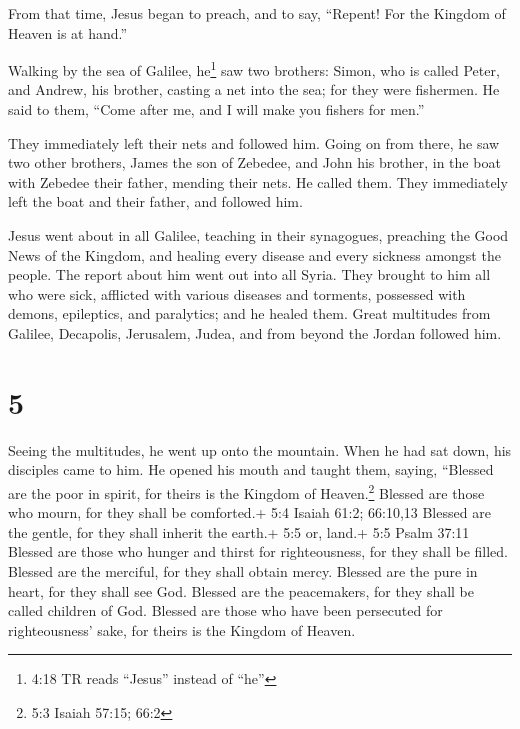  From that time, Jesus began to preach, and to say,
``Repent! For the Kingdom of Heaven is at hand.''

 Walking by the sea of Galilee, he\footnote{4:18 TR reads
  ``Jesus'' instead of ``he''} saw two brothers: Simon, who is called
Peter, and Andrew, his brother, casting a net into the sea; for they
were fishermen.  He said to them, ``Come after me, and I
will make you fishers for men.''

 They immediately left their nets and followed him.
 Going on from there, he saw two other brothers, James the
son of Zebedee, and John his brother, in the boat with Zebedee their
father, mending their nets. He called them.  They
immediately left the boat and their father, and followed him.

 Jesus went about in all Galilee, teaching in their
synagogues, preaching the Good News of the Kingdom, and healing every
disease and every sickness amongst the people.  The report
about him went out into all Syria. They brought to him all who were
sick, afflicted with various diseases and torments, possessed with
demons, epileptics, and paralytics; and he healed them. 
Great multitudes from Galilee, Decapolis, Jerusalem, Judea, and from
beyond the Jordan followed him.

\hypertarget{section-4}{%
\section{5}\label{section-4}}

 Seeing the multitudes, he went up onto the mountain. When
he had sat down, his disciples came to him.  He opened his
mouth and taught them, saying,  ``Blessed are the poor in
spirit, for theirs is the Kingdom of Heaven.\footnote{5:3 Isaiah 57:15;
  66:2}  Blessed are those who mourn, for they shall be
comforted.+ 5:4 Isaiah 61:2; 66:10,13  Blessed are the
gentle, for they shall inherit the earth.+ 5:5 or, land.+ 5:5 Psalm
37:11  Blessed are those who hunger and thirst for
righteousness, for they shall be filled.  Blessed are the
merciful, for they shall obtain mercy.  Blessed are the pure
in heart, for they shall see God.  Blessed are the
peacemakers, for they shall be called children of God. 
Blessed are those who have been persecuted for righteousness' sake, for
theirs is the Kingdom of Heaven.

